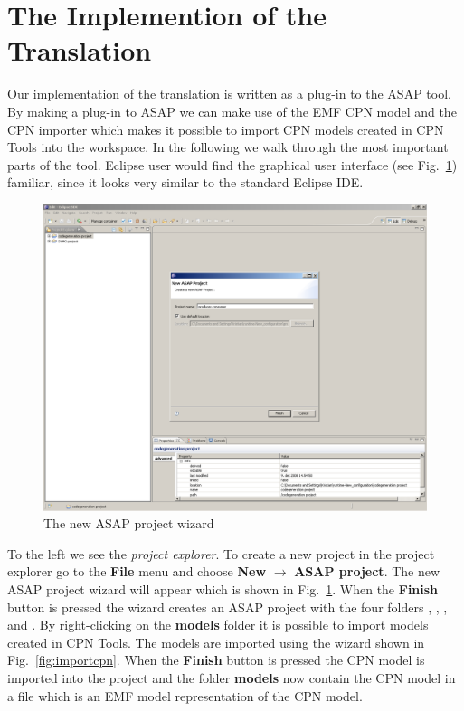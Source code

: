 \section{The Implemention of the Translation}
\label{sec:owntool}
Our implementation of the translation is written as a plug-in to the ASAP tool. By making a plug-in to ASAP we can make use of the EMF CPN model and the CPN importer which makes it possible to import CPN models created in CPN Tools into the workspace. In the following we walk through the most important parts of the tool. Eclipse user would find the graphical user interface (see Fig.~\ref{fig:newproject}) familiar, since it looks very similar to the standard Eclipse IDE.

\begin{figure}[h!]
\centering
\includegraphics[width=\textwidth]{techniques_and_tool/graphics/newproject.eps}
\caption{The new ASAP project wizard}
\label{fig:newproject}
\end{figure}

To the left we see the \emph{project explorer}. To create a new project in the project explorer go to the \textbf{File} menu and choose \textbf{New} $\rightarrow$ \textbf{ASAP project}. The new ASAP project wizard will appear which is shown in Fig.~\ref{fig:newproject}. When the \textbf{Finish} button is pressed the wizard creates an ASAP project with the four folders , , , and . By right-clicking on the \textbf{models} folder it is possible to import models created in CPN Tools. The models are imported using the wizard shown in Fig.~\ref{fig:importcpn}. When the \textbf{Finish} button is pressed the CPN model is imported into the project and the folder \textbf{models} now contain the CPN model in a  file which is an EMF model representation of the CPN model.


